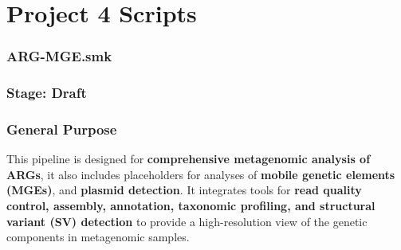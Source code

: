 \documentclass[11pt]{report}
\begin{document}
\part{Project 4 Scripts}
\section*{ ARG-MGE.smk}
\section*{Stage: Draft}   
\section*{General Purpose}

This pipeline is designed for \textbf{comprehensive metagenomic analysis of ARGs}, it also includes placeholders for analyses of \textbf{mobile genetic elements (MGEs)}, and \textbf{plasmid detection}. It integrates tools for \textbf{read quality control, assembly, annotation, taxonomic profiling, and structural variant (SV) detection} to provide a high-resolution view of the genetic components in metagenomic samples.
\end{document}
